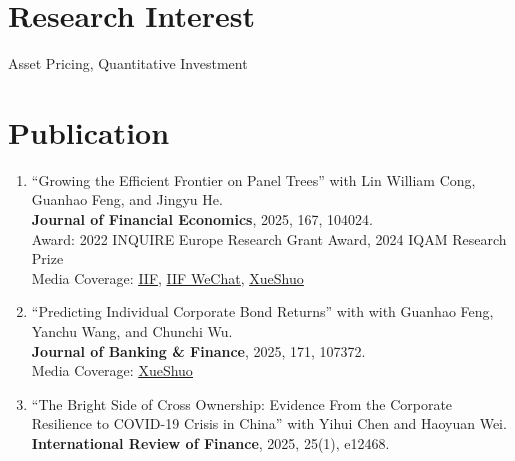 \documentclass{clean_cv}
\begin{document}
\section{Research Interest}
\begin{center}
	Asset Pricing, Quantitative Investment
\end{center}

\section{Publication}

\begin{enumerate}
	\setlength\itemsep{1.0em}
	

	\item “Growing the Efficient Frontier on Panel Trees” 
		with Lin William Cong, Guanhao Feng, and Jingyu He. \\
		\textbf{Journal of Financial Economics}, 2025, 167, 104024. 
		\\
		Award:
			2022 INQUIRE Europe Research Grant Award,
			2024 IQAM Research Prize 
			\\
		Media Coverage: 
			\href{https://iif.ustc.edu.cn/2025/0220/c19557a674300/page.htm}{\underline{IIF}}, 
			\href{https://mp.weixin.qq.com/s/rUE0shWHWTzA0EEig2ImCA}{\underline{IIF WeChat}}, 
			\href{https://mp.weixin.qq.com/s/_hwltnHmtVf8iTVh62LhBQ}{\underline{XueShuo}} 
		
	\item “Predicting Individual Corporate Bond Returns” 
		with with Guanhao Feng, Yanchu Wang, and Chunchi Wu. \\
		\textbf{Journal of Banking \& Finance}, 2025, 171, 107372. \\
		Media Coverage: 
			\href{https://mp.weixin.qq.com/s/_hwltnHmtVf8iTVh62LhBQ}{\underline{XueShuo}}
			
	\item “The Bright Side of Cross Ownership: Evidence From the Corporate Resilience to COVID-19 Crisis in China” 
		with Yihui Chen and Haoyuan Wei. \\
		\textbf{International Review of Finance}, 2025, 25(1), e12468.
	
\end{enumerate}
\end{document}
